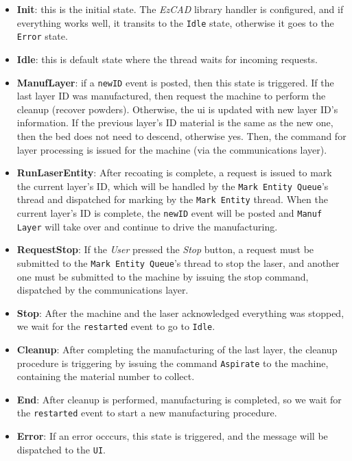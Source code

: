 \begin{itemize}
\item \textbf{Init}: this is the initial state. The \emph{EzCAD} library handler
  is configured, and if everything works well, it transits to the \texttt{Idle}
  state, otherwise it goes to the \texttt{Error} state.
\item \textbf{Idle}: this is default state where the thread waits for incoming
  requests.
\item \textbf{ManufLayer}: if a \texttt{newID} event is posted, then this state is
  triggered. If the last layer ID was manufactured, then request the machine to
  perform the cleanup (recover powders). Otherwise, the \gls{ui} is updated with
  new layer ID's information. If the previous layer's ID material is the same as
  the new one, then the bed does not need to descend, otherwise yes. Then, the
  command for layer processing is issued for the machine (via the communications
  layer).
\item \textbf{RunLaserEntity}: After recoating is complete, a request is issued to
  mark the current layer's ID, which will be handled by the
  \texttt{Mark Entity Queue}'s thread and dispatched for marking by the
  \texttt{Mark Entity} thread. When the current layer's ID is complete, the
  \texttt{newID} event will be posted and \texttt{Manuf Layer} will take over and
  continue to drive the manufacturing.
\item \textbf{RequestStop}: If the \emph{User} pressed the \emph{Stop} button,
  a request must be submitted to the \texttt{Mark Entity Queue}'s thread to stop
  the laser, and another one must be submitted to the machine by issuing the
  stop command, dispatched by the communications layer.
\item \textbf{Stop}: After the machine and the laser acknowledged everything was
  stopped, we wait for the \texttt{restarted} event to go to \texttt{Idle}.
\item \textbf{Cleanup}: After completing the manufacturing of the last layer,
  the cleanup procedure is triggering by issuing the command \texttt{Aspirate}
  to the machine, containing the material number to collect. 
\item \textbf{End}: After cleanup is performed, manufacturing is completed, so
  we wait for the \texttt{restarted} event to start a new manufacturing
  procedure.
\item \textbf{Error}: If an error occcurs, this state is triggered, and the
  message will be dispatched to the \texttt{UI}.
\end{itemize}

